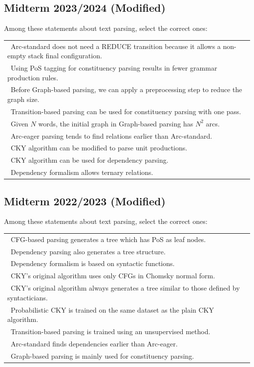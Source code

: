 \documentclass{../extra/aakpract/aakpract}
\begin{document}
	\subsection{Midterm 2023/2024 (Modified)}
	
	Among these statements about text parsing, select the correct ones:
	
	\begin{longtable}{|p{}|}
		\hline 
		\Square\ Arc-standard does not need a REDUCE transition because it allows a non-empty stack final configuration.\\
		\Square\ Using PoS tagging for constituency parsing results in fewer grammar production rules.\\
		\Square\ Before Graph-based parsing, we can apply a preprocessing step to reduce the graph size.\\
		\Square\ Transition-based parsing can be used for constituency parsing with one pass.\\
		\Square\ Given $N$ words, the initial graph in Graph-based parsing has $N^2$ arcs.\\
		\Square\ Arc-eager parsing tends to find relations earlier than Arc-standard.\\
		\Square\ CKY algorithm can be modified to parse unit productions.\\
		\Square\ CKY algorithm can be used for dependency parsing.\\
		\Square\ Dependency formalism allows ternary relations.\\
		\hline
	\end{longtable}
	
	\subsection{Midterm 2022/2023 (Modified)}
	
	Among these statements about text parsing, select the correct ones:
	
	\begin{longtable}{|p{}|}
		\hline 
		\Square\ CFG-based parsing generates a tree which has PoS as leaf nodes. \\
		\Square\ Dependency parsing also generates a tree structure. \\	
		\Square\ Dependency formalism is based on syntactic functions. \\
		\Square\ CKY's original algorithm uses only CFGs in Chomsky normal form. \\
		\Square\ CKY's original algorithm always generates a tree similar to those defined by syntacticians. \\
		\Square\ Probabilistic CKY is trained on the same dataset as the plain CKY algorithm. \\
		\Square\ Transition-based parsing is trained using an unsupervised method. \\
		\Square\ Arc-standard finds dependencies earlier than Arc-eager. \\
		\Square\ Graph-based parsing is mainly used for constituency parsing.\\
		\hline
	\end{longtable}
	
\end{document}
